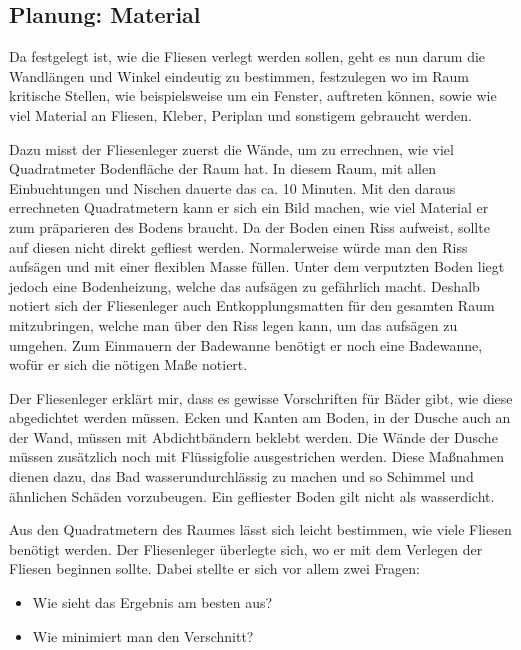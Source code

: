 \subsection{Planung: Material}

Da festgelegt ist, wie die Fliesen verlegt werden sollen, geht es nun darum die Wandlängen und Winkel eindeutig zu bestimmen, festzulegen wo im Raum kritische Stellen, wie beispielsweise um ein Fenster, auftreten können, sowie wie viel Material an Fliesen, Kleber, Periplan und sonstigem gebraucht werden.

Dazu misst der Fliesenleger zuerst die Wände, um zu errechnen, wie viel Quadratmeter Bodenfläche der Raum hat. In diesem Raum, mit allen Einbuchtungen und Nischen dauerte das ca. 10 Minuten. Mit den daraus errechneten Quadratmetern kann er sich ein Bild machen, wie viel Material er zum präparieren des Bodens braucht. Da der Boden einen Riss aufweist, sollte auf diesen nicht direkt gefliest werden. Normalerweise würde man den Riss aufsägen und mit einer flexiblen Masse füllen. Unter dem verputzten Boden liegt jedoch eine Bodenheizung, welche das aufsägen zu gefährlich macht. Deshalb notiert sich der Fliesenleger auch Entkopplungsmatten für den gesamten Raum mitzubringen, welche man über den Riss legen kann, um das aufsägen zu umgehen. Zum Einmauern der Badewanne benötigt er noch eine Badewanne, wofür er sich die nötigen Maße notiert.

Der Fliesenleger erklärt mir, dass es gewisse Vorschriften für Bäder gibt, wie diese abgedichtet werden müssen. Ecken und Kanten am Boden, in der Dusche auch an der Wand, müssen mit Abdichtbändern beklebt werden. Die Wände der Dusche müssen zusätzlich noch mit Flüssigfolie ausgestrichen werden. Diese Maßnahmen dienen dazu, das Bad wasserundurchlässig zu machen und so Schimmel und ähnlichen Schäden vorzubeugen. Ein gefliester Boden gilt nicht als wasserdicht.

Aus den Quadratmetern des Raumes lässt sich leicht bestimmen, wie viele Fliesen benötigt werden. Der Fliesenleger überlegte sich, wo er mit dem Verlegen der Fliesen beginnen sollte. Dabei stellte er sich vor allem zwei Fragen:

\begin{itemize}
	\item Wie sieht das Ergebnis am besten aus?
	\item Wie minimiert man den Verschnitt?
\end{itemize}

